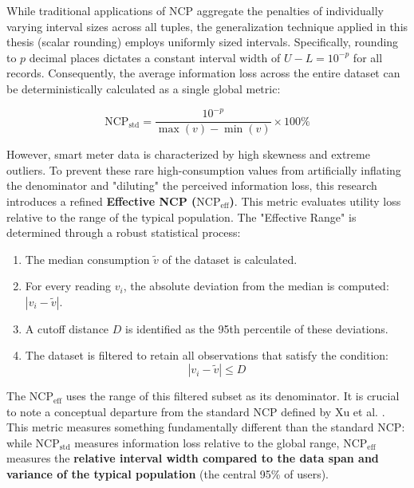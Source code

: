 While traditional applications of NCP aggregate the penalties of individually varying interval sizes across all tuples, the generalization technique applied in this thesis (scalar rounding) employs uniformly sized intervals. Specifically, rounding to $p$ decimal places dictates a constant interval width of $U - L = 10^{-p}$ for all records. Consequently, the average information loss across the entire dataset can be deterministically calculated as a single global metric:

\begin{equation}
    \text{NCP}_{\text{std}} = \frac{10^{-p}}{\max(v) - \min(v)} \times 100\%
    \label{eq:ncp_std_uniform}
\end{equation}


However, smart meter data is characterized by high skewness and extreme outliers. To prevent these rare high-consumption values from artificially inflating the denominator and "diluting" the perceived information loss, this research introduces a refined \textbf{Effective NCP ($\text{NCP}_{\text{eff}}$)}. This metric evaluates utility loss relative to the range of the typical population. The "Effective Range" is determined through a robust statistical process:
\begin{enumerate}
    \item The median consumption $\tilde{v}$ of the dataset is calculated.
    \item For every reading $v_i$, the absolute deviation from the median is computed: $|v_i - \tilde{v}|$.
    \item A cutoff distance $D$ is identified as the 95th percentile of these deviations.
    \item The dataset is filtered to retain all observations that satisfy the condition:
    \begin{equation}
        |v_i - \tilde{v}| \leq D
    \end{equation}
\end{enumerate}

The $\text{NCP}_{\text{eff}}$ uses the range of this filtered subset as its denominator. It is crucial to note a conceptual departure from the standard \ac{NCP} defined by Xu et al. \cite{UtilityBasedAnonymizationNCP}. This metric measures something fundamentally different than the standard \ac{NCP}: while $\text{NCP}_{\text{std}}$ measures information loss relative to the global range, $\text{NCP}_{\text{eff}}$ measures the \textbf{relative interval width compared to the data span and variance of the typical population} (the central 95\% of users).


